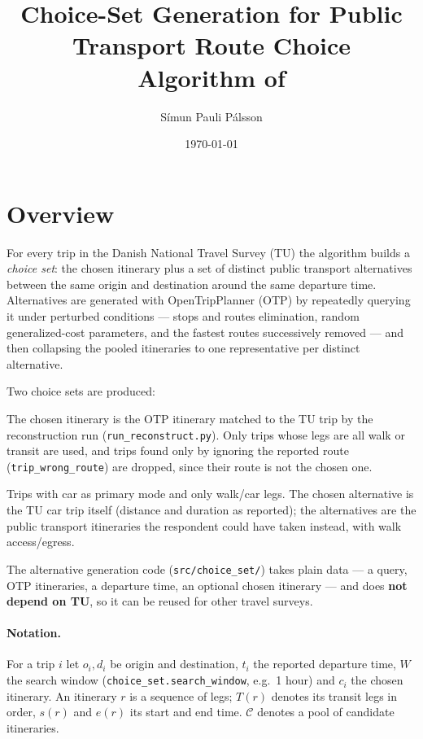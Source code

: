 \documentclass[11pt,a4paper]{article}
\title{Choice-Set Generation for Public Transport Route Choice\\
\large Algorithm of \code{run\_choice\_set.py}}
\author{Símun Pauli Pálsson}
\date{\today}
\newcommand{\code}[1]{\texttt{#1}}
\newcommand{\cand}{\mathcal{C}}
\begin{document}
\maketitle

\section{Overview}

For every trip in the Danish National Travel Survey (TU) the algorithm builds a \emph{choice set}: the
chosen itinerary plus a set of distinct public transport alternatives between the same origin and destination around the same departure time. Alternatives are generated with OpenTripPlanner (OTP) by repeatedly querying it under perturbed conditions --- stops and routes elimination, random generalized-cost parameters, and the fastest routes successively removed --- and then collapsing the pooled itineraries to one representative per distinct alternative.

Two choice sets are produced:
\begin{description}[leftmargin=1.5em]
  \item[Public transport trips.] The chosen itinerary is the OTP itinerary matched to the TU trip by
    the reconstruction run (\code{run\_reconstruct.py}). Only trips whose legs are all walk or transit
    are used, and trips found only by ignoring the reported route (\code{trip\_wrong\_route}) are
    dropped, since their route is not the chosen one.
  \item[Car trips.] Trips with car as primary mode and only walk/car legs. The chosen alternative is
    the TU car trip itself (distance and duration as reported); the alternatives are the public
    transport itineraries the respondent could have taken instead, with walk access/egress.
\end{description}

The alternative generation code (\code{src/choice\_set/}) takes plain data --- a query, OTP itineraries, a
departure time, an optional chosen itinerary --- and does \textbf{not depend on TU}, so it can be reused for
other travel surveys.

\paragraph{Notation.}
For a trip $i$ let $o_i, d_i$ be origin and destination, $t_i$ the reported departure time, $W$ the
search window (\code{choice\_set.search\_window}, e.g.\ 1 hour) and $c_i$ the chosen itinerary. An
itinerary $r$ is a sequence of legs; $T(r)$ denotes its transit legs in order, $s(r)$ and $e(r)$ its
start and end time. $\cand$ denotes a pool of candidate itineraries.
\end{document}
